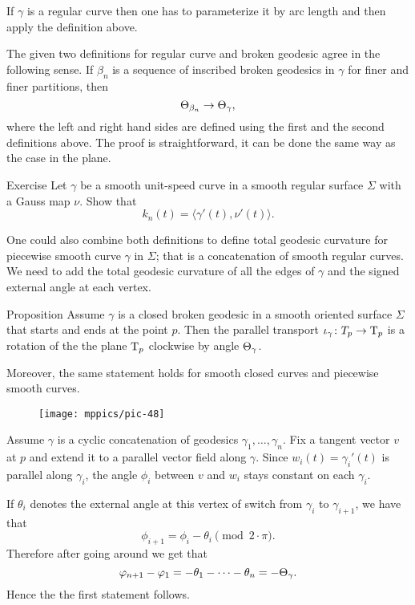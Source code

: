 If $\gamma$ is a regular curve then one has to parameterize it by arc length and then apply the definition above.

The given two definitions for regular curve and broken geodesic agree in the following sense.
If $\beta_n$ is a sequence of inscribed broken geodesics in $\gamma$ for finer and finer partitions, then 
\[\Theta_{\beta_n}\to\Theta_{\gamma},\]
where the left and right hand sides are defined using the first and the second definitions above.
The proof is straightforward, it can be done the same way as the case in the plane. %

\begin{thm}{Exercise}
Let $\gamma$ be a smooth unit-speed curve in a  smooth regular surface $\Sigma$ with a Gauss map $\nu$.
Show that 
\[k_n(t)=\langle\gamma'(t),\nu'(t)\rangle.\]

\end{thm}

One could also combine both definitions to define total geodesic curvature for 
piecewise smooth curve $\gamma$ in $\Sigma$; that is
a concatenation of smooth regular curves.
We need to add the total geodesic curvature of all the edges of $\gamma$ and the signed external angle at each vertex. 



\begin{thm}{Proposition}\label{prop:pt+tgc}
Assume $\gamma$ is a closed broken geodesic in a smooth oriented surface $\Sigma$ that starts and ends at the point $p$.
Then the parallel transport $\iota_\gamma\colon T_p\to\mathrm{T}_p$ is a rotation of the the plane $\mathrm{T}_p$ clockwise by angle $\Theta_{\gamma}$.

Moreover, the same statement holds for smooth closed curves and piecewise smooth curves.
\end{thm}

\begin{wrapfigure}{o}{22 mm}
\vskip-0mm
\centering
\texttt{[image: mppics/pic-48]}
\vskip-0mm
\end{wrapfigure}

Assume $\gamma$ is a cyclic concatenation of geodesics $\gamma_1,\dots,\gamma_n$.
Fix a tangent vector $v$ at $p$ and extend it to a parallel vector field along $\gamma$.
Since $w_i(t)=\gamma_i'(t)$ is parallel along $\gamma_i$, the angle $\phi_i$ between $v$ and $w_i$ stays constant on each $\gamma_i$.

If $\theta_i$ denotes the external angle at this vertex of switch from $\gamma_{i}$ to $\gamma_{i+1}$, we have that 
\[\phi_{i+1}=\phi_i-\theta_i \pmod{2\cdot\pi}.\]
Therefore after going around we get that 
\[\varphi_{n+1}-\varphi_1=-\theta_1-\dots-\theta_n=-\Theta_{\gamma}.\]
Hence the the first statement follows.

